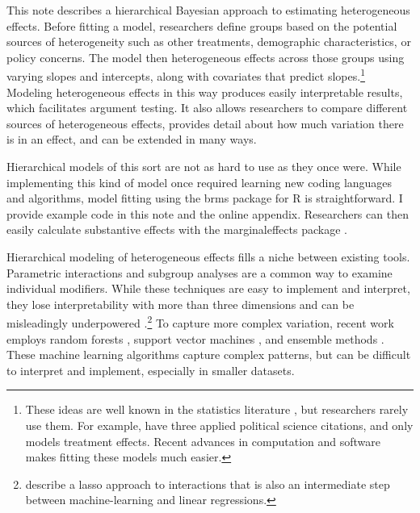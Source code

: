 \documentclass[12pt]{article}
\begin{document}

This note describes a hierarchical Bayesian approach to estimating heterogeneous effects. 
Before fitting a model, researchers define groups based on the potential sources of heterogeneity such as other treatments, demographic characteristics, or policy concerns. 
The model then heterogeneous effects across those groups using varying slopes and intercepts, along with covariates that predict slopes.\footnote{These ideas are well known in the statistics literature \citep{FellerGelman2015}, but researchers rarely use them. For example, \citet{FellerGelman2015} have three applied political science citations, and only \citet{Marquardt2022} models treatment effects. Recent advances in computation and software makes fitting these models much easier.} 
Modeling heterogeneous effects in this way produces easily interpretable results, which facilitates argument testing.
It also allows researchers to compare different sources of heterogeneous effects, provides detail about how much variation there is in an effect, and can be extended in many ways.  


Hierarchical models of this sort are not as hard to use as they once were. 
While implementing this kind of model once required learning new coding languages and algorithms, model fitting using the brms package for \textsf{R} is straightforward. 
I provide example code in this note and the online appendix.
Researchers can then easily calculate substantive effects with the marginaleffects package \citep{ArelBundockme}.


Hierarchical modeling of heterogeneous effects fills a niche between existing tools.
Parametric interactions and subgroup analyses are a common way to examine individual modifiers. 
While these techniques are easy to implement and interpret, they lose interpretability with more than three dimensions and can be misleadingly underpowered \citep{Simmonsetal2011}.\footnote{\citet{BlackwellOlson2022} describe a lasso approach to interactions that is also an intermediate step between machine-learning and linear regressions.}
To capture more complex variation, recent work employs random forests \citep{GreenKern2012, WagerAthey2018}, support vector machines \citep{ImaiRatkovic2013}, and ensemble methods \citep{Grimmeretal2017, Kuenzeletal2019, Dorieetal2022}.
These machine learning algorithms capture complex patterns, but can be difficult to interpret and implement, especially in smaller datasets. 
\end{document}
